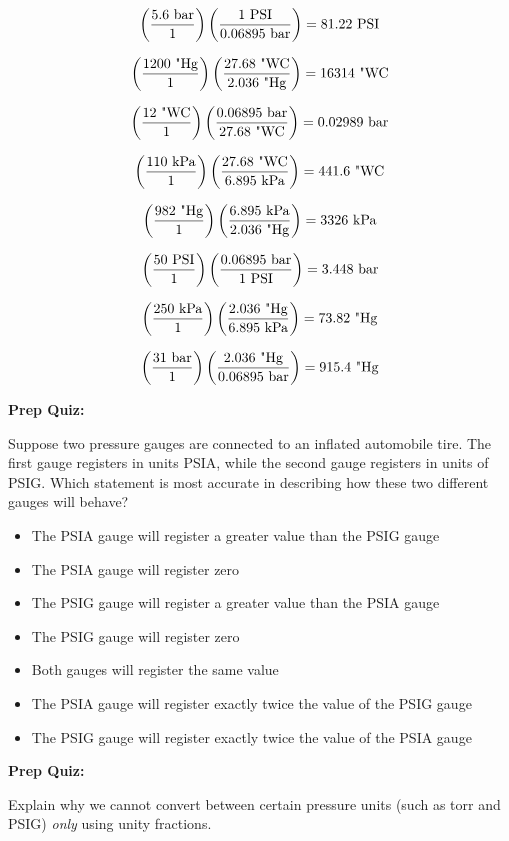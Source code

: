 $$\left(5.6 \hbox{ bar} \over 1 \right) \left(1 \hbox{ PSI} \over 0.06895 \hbox{ bar}\right) = 81.22 \hbox{ PSI} $$

$$\left(1200 \hbox{ "Hg} \over 1 \right) \left(27.68 \hbox{ "WC} \over 2.036 \hbox{ "Hg}\right) = 16314 \hbox{ "WC} $$

$$\left(12 \hbox{ "WC} \over 1 \right) \left(0.06895 \hbox{ bar} \over 27.68 \hbox{ "WC}\right) = 0.02989 \hbox{ bar} $$

$$\left(110 \hbox{ kPa} \over 1 \right) \left(27.68 \hbox{ "WC} \over 6.895 \hbox{ kPa}\right) = 441.6 \hbox{ "WC} $$

$$\left(982 \hbox{ "Hg} \over 1 \right) \left(6.895 \hbox{ kPa} \over 2.036 \hbox{ "Hg}\right) = 3326 \hbox{ kPa} $$

$$\left(50 \hbox{ PSI} \over 1 \right) \left(0.06895 \hbox{ bar} \over 1 \hbox{ PSI}\right) = 3.448 \hbox{ bar} $$

$$\left(250 \hbox{ kPa} \over 1 \right) \left(2.036 \hbox{ "Hg} \over 6.895 \hbox{ kPa}\right) = 73.82 \hbox{ "Hg} $$

$$\left(31 \hbox{ bar} \over 1 \right) \left(2.036 \hbox{ "Hg} \over 0.06895 \hbox{ bar}\right) = 915.4 \hbox{ "Hg} $$









\vfil \eject

\noindent
{\bf Prep Quiz:}

Suppose two pressure gauges are connected to an inflated automobile tire.  The first gauge registers in units PSIA, while the second gauge registers in units of PSIG.  Which statement is most accurate in describing how these two different gauges will behave?

\begin{itemize}
\item{} The PSIA gauge will register a greater value than the PSIG gauge
\vskip 5pt 
\item{} The PSIA gauge will register zero 
\vskip 5pt 
\item{} The PSIG gauge will register a greater value than the PSIA gauge 
\vskip 5pt 
\item{} The PSIG gauge will register zero 
\vskip 5pt 
\item{} Both gauges will register the same value
\vskip 5pt 
\item{} The PSIA gauge will register exactly twice the value of the PSIG gauge
\vskip 5pt 
\item{} The PSIG gauge will register exactly twice the value of the PSIA gauge
\end{itemize}









\vfil \eject

\noindent
{\bf Prep Quiz:}

Explain why we cannot convert between certain pressure units (such as torr and PSIG) {\it only} using unity fractions.





